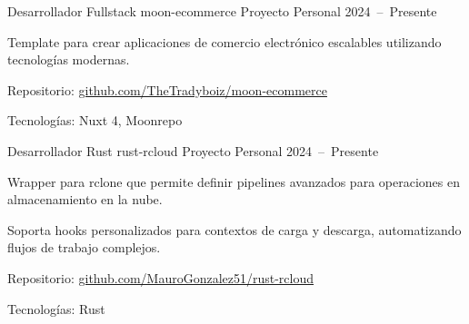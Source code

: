 

\begin{cventries}
  \cventry
    {Desarrollador Fullstack}
    {moon-ecommerce}
    {Proyecto Personal}
    {2024~--~Presente}
    {
      \begin{cvitems}
        \item {Template para crear aplicaciones de comercio electrónico escalables utilizando tecnologías modernas.}
        \item {Repositorio: \href{https://github.com/TheTradyboiz/moon-ecommerce}{github.com/TheTradyboiz/moon-ecommerce}}
        \item {Tecnologías: Nuxt 4, Moonrepo}
      \end{cvitems}
    }
\end{cventries}

\smallskip

\begin{cventries}
    \cventry
      {Desarrollador Rust}
      {rust-rcloud}
      {Proyecto Personal}
      {2024~--~Presente}
      {
        \begin{cvitems}
          \item {Wrapper para rclone que permite definir pipelines avanzados para operaciones en almacenamiento en la nube.}
          \item {Soporta hooks personalizados para contextos de carga y descarga, automatizando flujos de trabajo complejos.}
          \item {Repositorio: \href{https://github.com/MauroGonzalez51/rust-rcloud}{github.com/MauroGonzalez51/rust-rcloud}}
          \item {Tecnologías: Rust}
        \end{cvitems}
      }
\end{cventries}

